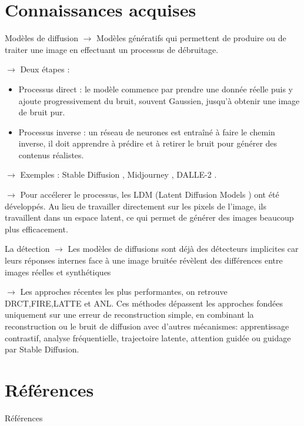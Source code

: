 \documentclass[10pt,aspectratio=169]{beamer}
\begin{document}
\section{Connaissances acquises}

\begin{frame}{Modèles de diffusion}
    $\to$ Modèles génératifs qui permettent de produire ou de traiter une image en effectuant un processus de débruitage.

    \bigskip

    $\to$ Deux étapes :
    \begin{itemize}
        \item Processus direct : le modèle commence par prendre une donnée réelle puis y ajoute progressivement du bruit, souvent Gaussien, jusqu'à obtenir une image de bruit pur.
        \item Processus inverse : un réseau de neurones est entraîné à faire le chemin inverse, il doit apprendre à prédire et à retirer le bruit pour générer des contenus réalistes.
    \end{itemize}

    \bigskip 

    $\to$ Exemples : Stable Diffusion \citep{rombach2022highresolutionimagesynthesislatent}, Midjourney \citep{midjourney2022}, DALLE-2 \citep{ramesh}.
    
    \bigskip

    $\to$ Pour accélerer le processus, les LDM (Latent Diffusion Models \citep{rombach2022highresolutionimagesynthesislatent}) ont été développés. Au lieu de travailler directement sur les pixels de l'image, ils travaillent dans un espace latent, ce qui permet de générer des images beaucoup plus efficacement.
\end{frame}

\begin{frame}{La détection}
    $\to$ Les modèles de diffusions sont déjà des détecteurs implicites car leurs réponses internes face à une image bruitée révèlent des différences entre images réelles et synthétiques \citep{wang}

    \bigskip
    
    $\to$ Les approches récentes les plus performantes, on retrouve DRCT,FIRE,LATTE et ANL. Ces méthodes dépassent les approches fondées uniquement sur une erreur de reconstruction simple, en combinant la reconstruction ou le bruit de diffusion   avec d'autres mécanismes: apprentissage contrastif, analyse fréquentielle, trajectoire latente, attention guidée ou guidage par Stable Diffusion.
\end{frame}

\section{Références}
\begin{frame}[allowframebreaks]{Références}


\end{frame}
\end{document}
